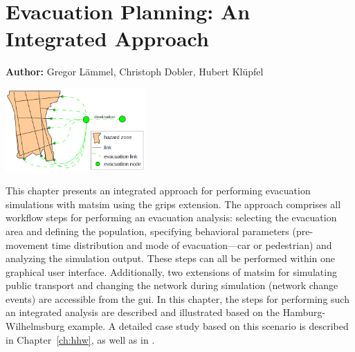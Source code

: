 \chapter{Evacuation Planning: An Integrated Approach}
\label{ch:evacuation}

\hfill \textbf{Author:} Gregor Lämmel, Christoph Dobler, Hubert Klüpfel 

\begin{center} \includegraphics[width=0.4\textwidth, angle=0]{extending/figures/Evacuation/evacuation} \end{center}



This chapter presents an integrated approach for performing evacuation simulations with \gls{matsim} using the \gls{grips} extension. %
The approach comprises all workflow steps for performing an evacuation analysis: \ie selecting the evacuation area and defining the population, specifying  behavioral parameters (\ie  pre-movement time distribution and mode of evacuation---car or pedestrian) and analyzing the simulation output. These steps can all be performed within one graphical user interface. Additionally, two extensions of \gls{matsim} for simulating public transport and changing the network during simulation (\ie network change events) are accessible from the \gls{gui}. In this chapter, the steps for performing such an integrated analysis are described and illustrated based on the Hamburg-Wilhelmsburg example. A detailed case study based on this scenario is described in Chapter~\ref{ch:hhw}, as well as in \citet{00DurstAtAl2012PEDGRIPSAppl,Hugenbusch2012Bachelor}.

